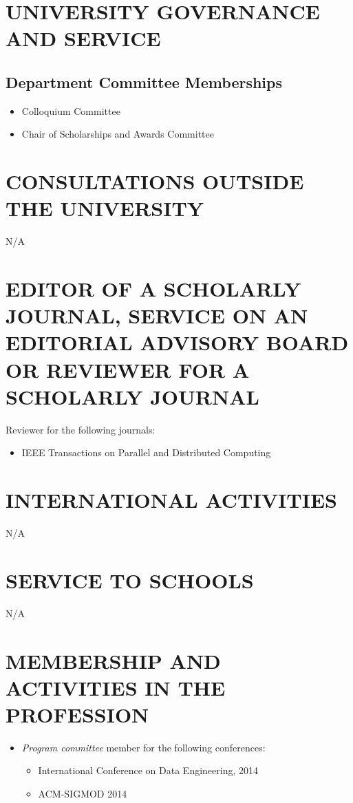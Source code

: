 \documentclass{article}
\begin{document}
\section{UNIVERSITY GOVERNANCE AND SERVICE}

\subsection{Department Committee Memberships}
\begin{itemize}
  \item Colloquium Committee 
  \item Chair of Scholarships and Awards Committee 
\end{itemize}

\section{CONSULTATIONS OUTSIDE THE UNIVERSITY}

N/A

\section{EDITOR OF A SCHOLARLY JOURNAL, SERVICE ON AN EDITORIAL
  ADVISORY BOARD OR REVIEWER FOR A SCHOLARLY JOURNAL}

Reviewer for the following journals:

\begin{itemize}
\item IEEE Transactions on Parallel and Distributed Computing
\end{itemize}

\section{INTERNATIONAL ACTIVITIES}

N/A

\section{SERVICE TO SCHOOLS}

N/A

\section{MEMBERSHIP AND ACTIVITIES IN THE PROFESSION}
\begin{itemize}
\item \emph{Program committee} member for the following conferences:
  \begin{itemize}
  \item International Conference on Data Engineering, 2014
  \item ACM-SIGMOD 2014
  \end{itemize}
\end{itemize}
\end{document}

